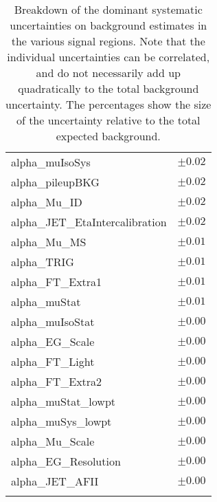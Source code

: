 \begin{table}
\begin{center}
\begin{tabular*}{\textwidth}{@{\extracolsep{\fill}}lc}
alpha\_muIsoSys         & $\pm 0.02$       \\
alpha\_pileupBKG         & $\pm 0.02$       \\
alpha\_Mu\_ID         & $\pm 0.02$       \\
alpha\_JET\_EtaIntercalibration         & $\pm 0.02$       \\
alpha\_Mu\_MS         & $\pm 0.01$       \\
alpha\_TRIG         & $\pm 0.01$       \\
alpha\_FT\_Extra1         & $\pm 0.01$       \\
alpha\_muStat         & $\pm 0.01$       \\
alpha\_muIsoStat         & $\pm 0.00$       \\
alpha\_EG\_Scale         & $\pm 0.00$       \\
alpha\_FT\_Light         & $\pm 0.00$       \\
alpha\_FT\_Extra2         & $\pm 0.00$       \\
alpha\_muStat\_lowpt         & $\pm 0.00$       \\
alpha\_muSys\_lowpt         & $\pm 0.00$       \\
alpha\_Mu\_Scale         & $\pm 0.00$       \\
alpha\_EG\_Resolution         & $\pm 0.00$       \\
alpha\_JET\_AFII         & $\pm 0.00$       \\
\noalign{\smallskip}\hline\noalign{\smallskip}
\end{tabular*}
\end{center}
\caption[Breakdown of uncertainty on background estimates]{
Breakdown of the dominant systematic uncertainties on background estimates in the various signal regions.
Note that the individual uncertainties can be correlated, and do not necessarily add up quadratically to 
the total background uncertainty. The percentages show the size of the uncertainty relative to the total expected background.
\label{table.results.bkgestimate.uncertainties.SR1b1}}
\end{table}
\clearpage
%